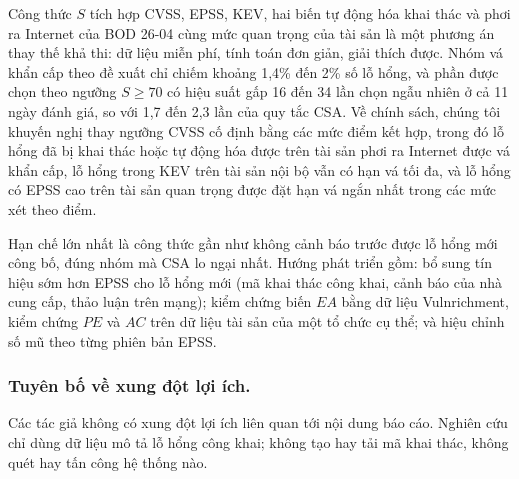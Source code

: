 \documentclass[runningheads]{llncs}
\renewcommand{\discintname}{Tuyên bố về xung đột lợi ích.}
\begin{document}
Công thức $S$ tích hợp CVSS, EPSS, KEV, hai biến tự động hóa khai thác và phơi ra Internet của BOD 26-04 cùng mức quan trọng của tài sản là một phương án thay thế khả thi: dữ liệu miễn phí, tính toán đơn giản, giải thích
được. Nhóm vá khẩn cấp theo đề xuất chỉ chiếm khoảng 1,4\% đến 2\% số lỗ hổng, và phần được chọn theo
ngưỡng $S \ge 70$ có hiệu suất gấp 16 đến 34 lần chọn ngẫu nhiên ở cả 11 ngày đánh giá, so với 1,7 đến 2,3
lần của quy tắc CSA. Về chính sách, chúng tôi khuyến nghị thay ngưỡng CVSS cố định bằng các
mức điểm kết hợp, trong đó lỗ hổng đã bị khai thác hoặc tự động hóa được trên tài sản phơi ra Internet được vá khẩn cấp, lỗ hổng trong KEV trên tài sản nội bộ vẫn có hạn vá tối đa, và lỗ hổng có EPSS cao trên
tài sản quan trọng được đặt hạn vá ngắn nhất trong các mức xét theo điểm.

Hạn chế lớn nhất là công thức gần như không cảnh báo trước được lỗ hổng mới công bố, đúng nhóm
mà CSA lo ngại nhất. Hướng phát triển gồm: bổ sung tín hiệu sớm hơn EPSS cho lỗ hổng mới (mã
khai thác công khai, cảnh báo của nhà cung cấp, thảo luận trên mạng); kiểm chứng biến $\mathit{EA}$ bằng dữ liệu Vulnrichment, kiểm chứng $\mathit{PE}$ và $AC$ trên dữ liệu tài sản của một tổ chức cụ thể; và hiệu chỉnh số mũ theo từng phiên bản EPSS.

\begin{credits}
\subsubsection{\discintname}
Các tác giả không có xung đột lợi ích liên quan tới nội dung báo cáo. Nghiên cứu chỉ dùng dữ
liệu mô tả lỗ hổng công khai; không tạo hay tải mã khai thác, không quét hay tấn công hệ thống nào.
\end{credits}
\end{document}
